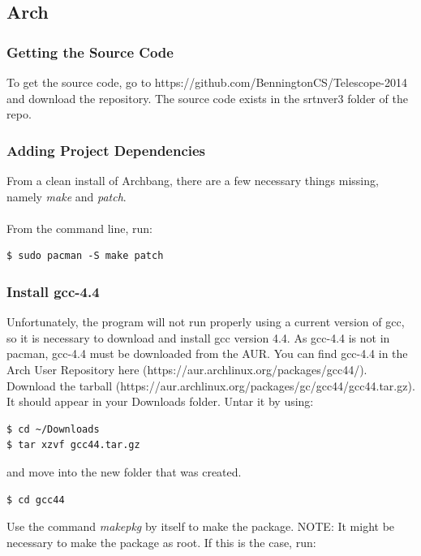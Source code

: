 \documentclass[11pt]{article} %
\begin{document}

\subsection{Arch}


\subsubsection{Getting the Source Code}
To get the source code, go to https://github.com/BenningtonCS/Telescope-2014 and download the repository. The source code exists in the srtnver3 folder of the repo.


\subsubsection{Adding Project Dependencies}
From a clean install of Archbang, there are a few necessary things missing, namely \emph{make} and \emph{patch}.
\\ \\
From the command line, run:

\begin{lstlisting}[frame=single]
$ sudo pacman -S make patch
\end{lstlisting}

\subsubsection{Install gcc-4.4}
Unfortunately, the program will not run properly using a current version of gcc, so it is necessary to download and install gcc version 4.4. As gcc-4.4 is not in pacman, gcc-4.4 must be downloaded from the AUR. You can find gcc-4.4 in the Arch User Repository here (https://aur.archlinux.org/packages/gcc44/). Download the tarball (https://aur.archlinux.org/packages/gc/gcc44/gcc44.tar.gz). It should appear in your Downloads folder. Untar it by using:

\begin{lstlisting}[frame=single]
$ cd ~/Downloads
$ tar xzvf gcc44.tar.gz
\end{lstlisting}

\noindent and move into the new folder that was created.

\begin{lstlisting}[frame=single]
$ cd gcc44
\end{lstlisting}

\noindent Use the command \emph{makepkg} by itself to make the package. NOTE: It might be necessary to make the package as root. If this is the case, run:
\end{document}
